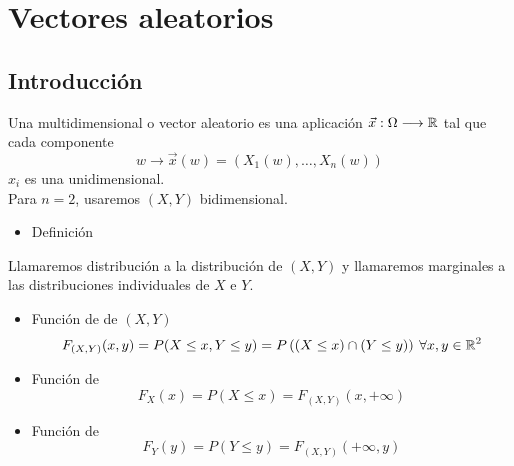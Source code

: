 \section{Vectores aleatorios}
\subsection{Introducción}
Una \va multidimensional o vector aleatorio es una aplicación $\vec{x}:\Omega\longrightarrow\operatorname{\mathbb{R}}$ tal que cada componente \[ w\longrightarrow \vec{x}(w)=(X_1(w),\dots,X_n(w)) \]$x_i$ es una \va unidimensional.\\
Para $n=2$, usaremos $(X,Y)$ \va bidimensional.
\begin{itemize}[label=\color{red}\textbullet, leftmargin=*]
	\item \color{lightblue}Definición
\end{itemize}
Llamaremos distribución  a la distribución de $(X,Y)$ y llamaremos marginales a las distribuciones individuales de $X$ e $Y$.
\begin{itemize}
	\item Función de  de $(X,Y)$\[ F_{(X,Y)}(x,y)=P(X\le x,Y\le y)=P\left((X\le x)\cap(Y\le y)\right)\:\forall x,y\in\operatorname{\mathbb{R}}^2\]
	\item Función de \[ F_X(x)=P(X\le x)=F_{(X,Y)}(x,+\infty) \]
	\item Función de \[ F_Y(y)=P(Y\le y)=F_{(X,Y)}(+\infty,y) \]
\end{itemize}
